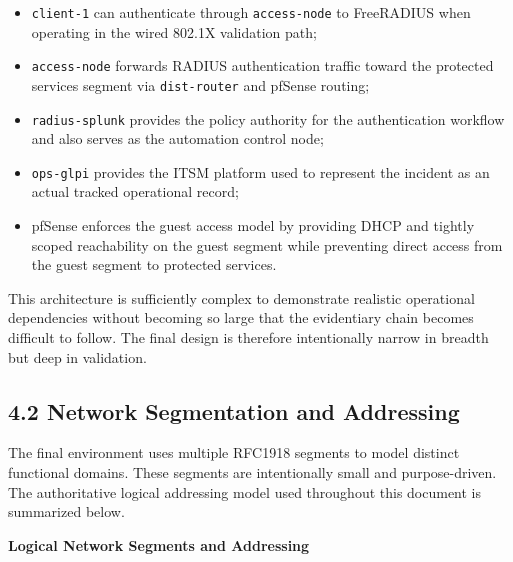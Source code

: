 \documentclass[11pt]{article}
\begin{document}
\begin{itemize}
    \item \texttt{client-1} can authenticate through \texttt{access-node} to FreeRADIUS when operating in the wired 802.1X validation path;
    \item \texttt{access-node} forwards RADIUS authentication traffic toward the protected services segment via \texttt{dist-router} and pfSense routing;
    \item \texttt{radius-splunk} provides the policy authority for the authentication workflow and also serves as the automation control node;
    \item \texttt{ops-glpi} provides the ITSM platform used to represent the incident as an actual tracked operational record;
    \item pfSense enforces the guest access model by providing DHCP and tightly scoped reachability on the guest segment while preventing direct access from the guest segment to protected services.
\end{itemize}

This architecture is sufficiently complex to demonstrate realistic operational dependencies without becoming so large that the evidentiary chain becomes difficult to follow. The final design is therefore intentionally narrow in breadth but deep in validation.


\subsection{4.2 Network Segmentation and Addressing}
\label{sec:network-segmentation-and-addressing}

The final environment uses multiple RFC1918 segments to model distinct functional domains. These segments are intentionally small and purpose-driven. The authoritative logical addressing model used throughout this document is summarized below.

\textbf{Logical Network Segments and Addressing}
\end{document}
